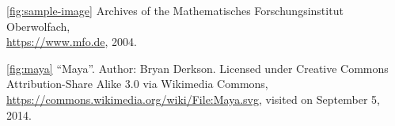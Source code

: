 \documentclass{snapshotmfo}
\begin{document}
\begin{imagecredits}
  \item[\autoref{fig:sample-image}] Archives of the Mathematisches Forschungsinstitut Oberwolfach,\\\url{https://www.mfo.de}, 2004.
  \item[\autoref{fig:maya}] ``Maya''. Author: Bryan Derkson. Licensed under Creative Commons Attribution-Share Alike 3.0 via Wikimedia Commons, \url{https://commons.wikimedia.org/wiki/File:Maya.svg}, visited on September 5, 2014.
\end{imagecredits}


\end{document}
